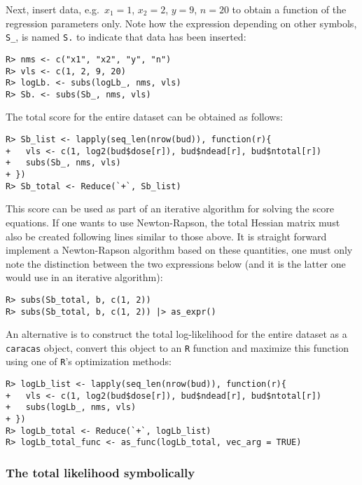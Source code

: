 Next, insert data, e.g.~\(x_{1}=1\), \(x_{2}=2\), \(y=9\), \(n=20\) to obtain a function of the regression parameters only. Note how the expression depending on other symbols, \texttt{S\_}, is
named \texttt{S.} to indicate that data has been inserted:

\begin{verbatim}
R> nms <- c("x1", "x2", "y", "n")
R> vls <- c(1, 2, 9, 20)
R> logLb. <- subs(logLb_, nms, vls)
R> Sb. <- subs(Sb_, nms, vls)
\end{verbatim}

The total score for the entire dataset can be obtained as follows:

\begin{verbatim}
R> Sb_list <- lapply(seq_len(nrow(bud)), function(r){
+   vls <- c(1, log2(bud$dose[r]), bud$ndead[r], bud$ntotal[r])
+   subs(Sb_, nms, vls) 
+ })
R> Sb_total <- Reduce(`+`, Sb_list)
\end{verbatim}

This score can be used as part of an iterative algorithm for solving the score equations.
If one wants to use Newton-Rapson, the total Hessian matrix must also be created
following lines similar to those above.
It is straight forward implement a Newton-Rapson algorithm based on these
quantities, one must only note the distinction between the two expressions
below (and it is the latter one would use in an iterative algorithm):

\begin{verbatim}
R> subs(Sb_total, b, c(1, 2))
R> subs(Sb_total, b, c(1, 2)) |> as_expr()
\end{verbatim}

An alternative is to construct the total log-likelihood
for the entire dataset as a \texttt{caracas} object, convert this
object to an \texttt{R} function and maximize this
function using one of \texttt{R}'s optimization methods:

\begin{verbatim}
R> logLb_list <- lapply(seq_len(nrow(bud)), function(r){
+   vls <- c(1, log2(bud$dose[r]), bud$ndead[r], bud$ntotal[r])
+   subs(logLb_, nms, vls) 
+ })
R> logLb_total <- Reduce(`+`, logLb_list)
R> logLb_total_func <- as_func(logLb_total, vec_arg = TRUE)
\end{verbatim}

\hypertarget{the-total-likelihood-symbolically}{%
\subsubsection{The total likelihood symbolically}\label{the-total-likelihood-symbolically}}

